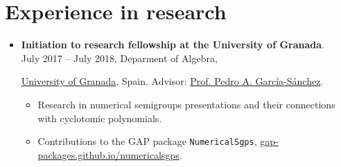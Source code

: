 \documentclass[10pt,a4paper,sans]{moderncv} %
\begin{document}

\vspace*{-3mm}
\section{Experience in research}

\begin{itemize}
\item \textbf{Initiation to research fellowship at the University of Granada}. \\
  July 2017 -- July 2018, Deparment of Algebra, {\href{http://investigacion.ugr.es/pages/planpropio/2017/p5}{University of Granada}, Spain. Advisor: \textcolor{colorl}{\href{https://scholar.google.es/citations?user=gvq9UmMAAAAJ&hl=es&oi=ao}{Prof. Pedro A. Garc\'ia-S\'anchez}}.
\begin{itemize}
\item Research in numerical semigroups presentations and their connections with cyclotomic polynomials.
\item  Contributions to the GAP package \texttt{NumericalSgps}, \textcolor{colorl}{\url{gap-packages.github.io/numericalsgps}}.
\end{itemize}

}
\end{itemize}
\end{document}
